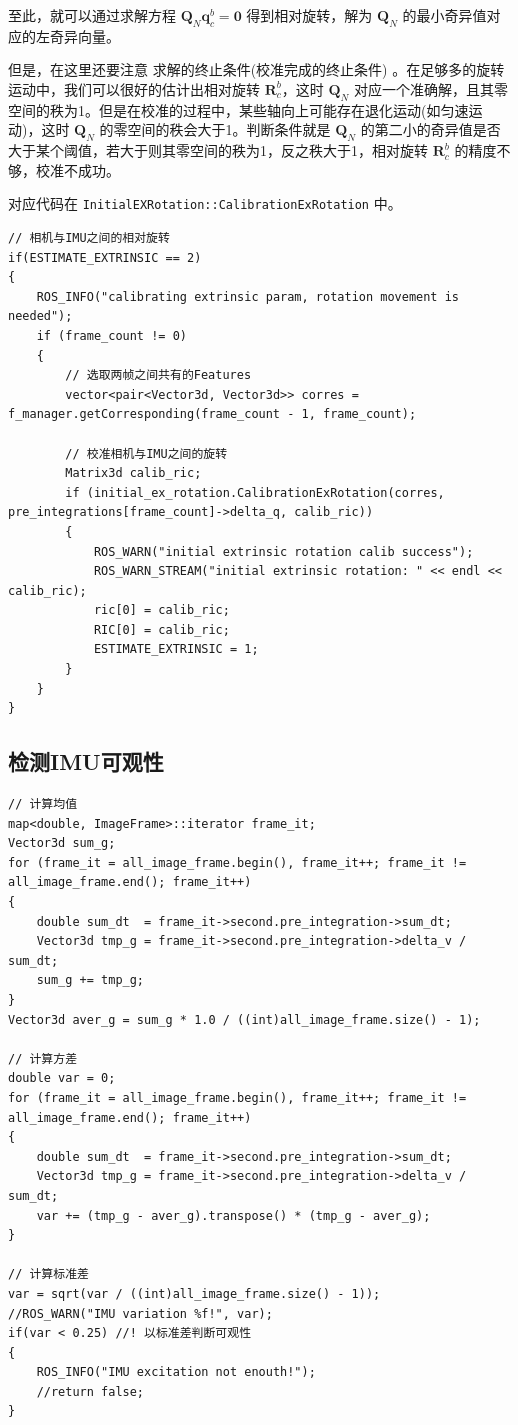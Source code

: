\documentclass[12pt,a4paper]{article}
\begin{document}
至此，就可以通过求解方程 $\mathbf{Q}_N \mathbf{q}_c^b = \boldsymbol{0}$ 得到相对旋转，解为 $\mathbf{Q}_N$ 的最小奇异值对应的左奇异向量。

但是，在这里还要注意 求解的终止条件(校准完成的终止条件) 。在足够多的旋转运动中，我们可以很好的估计出相对旋转 $\mathbf{R}_{c}^{b}$，这时 $\mathbf{Q}_{N}$ 对应一个准确解，且其零空间的秩为1。但是在校准的过程中，某些轴向上可能存在退化运动(如匀速运动)，这时 $\mathbf{Q}_{N}$ 的零空间的秩会大于1。{\color{red}判断条件就是 $\mathbf{Q}_N$ 的第二小的奇异值是否大于某个阈值，若大于则其零空间的秩为1，反之秩大于1，相对旋转 $\mathbf{R}_{c}^{b}$ 的精度不够，校准不成功。}  

对应代码在 \verb|InitialEXRotation::CalibrationExRotation| 中。

\begin{lstlisting}
// 相机与IMU之间的相对旋转
if(ESTIMATE_EXTRINSIC == 2)
{
    ROS_INFO("calibrating extrinsic param, rotation movement is needed");
    if (frame_count != 0)
    {
        // 选取两帧之间共有的Features
        vector<pair<Vector3d, Vector3d>> corres = f_manager.getCorresponding(frame_count - 1, frame_count);

        // 校准相机与IMU之间的旋转
        Matrix3d calib_ric;
        if (initial_ex_rotation.CalibrationExRotation(corres, pre_integrations[frame_count]->delta_q, calib_ric))
        {
            ROS_WARN("initial extrinsic rotation calib success");
            ROS_WARN_STREAM("initial extrinsic rotation: " << endl << calib_ric);
            ric[0] = calib_ric;
            RIC[0] = calib_ric;
            ESTIMATE_EXTRINSIC = 1;
        }
    }
}
\end{lstlisting}

\subsection{检测IMU可观性}

\begin{lstlisting}
// 计算均值
map<double, ImageFrame>::iterator frame_it;
Vector3d sum_g;
for (frame_it = all_image_frame.begin(), frame_it++; frame_it != all_image_frame.end(); frame_it++)
{
    double sum_dt  = frame_it->second.pre_integration->sum_dt;
    Vector3d tmp_g = frame_it->second.pre_integration->delta_v / sum_dt;
    sum_g += tmp_g;
}
Vector3d aver_g = sum_g * 1.0 / ((int)all_image_frame.size() - 1);

// 计算方差
double var = 0;
for (frame_it = all_image_frame.begin(), frame_it++; frame_it != all_image_frame.end(); frame_it++)
{
    double sum_dt  = frame_it->second.pre_integration->sum_dt;
    Vector3d tmp_g = frame_it->second.pre_integration->delta_v / sum_dt;
    var += (tmp_g - aver_g).transpose() * (tmp_g - aver_g);
}

// 计算标准差
var = sqrt(var / ((int)all_image_frame.size() - 1));
//ROS_WARN("IMU variation %f!", var);
if(var < 0.25) //! 以标准差判断可观性
{
    ROS_INFO("IMU excitation not enouth!");
    //return false;
}
\end{lstlisting}
\end{document}
